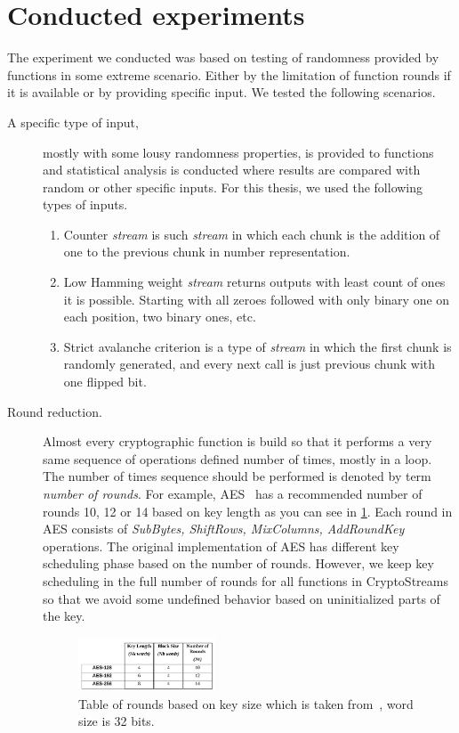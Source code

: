 \documentclass[
    digital,    %
    oneside,    %
    color,
    11pt,
    nocover,
    notable,
    nolof,
    nolot,
    final
]{fithesis3}
\renewcommand\_{\textunderscore\allowbreak}
\begin{document}
\section{Conducted experiments}
\label{sec:conducted-experiments}

The experiment we conducted was based on testing of randomness provided by functions in some extreme scenario. Either by the limitation of function rounds if it is available or by providing specific input. We tested the following scenarios.

\begin{description}
	\item[A specific type of input,] mostly with some lousy randomness properties, is provided to functions and statistical analysis is conducted where results are compared with random or other specific inputs. For this thesis, we used the following types of inputs.
	\begin{enumerate}
		\item Counter \textit{stream} is such \textit{stream} in which each chunk is the addition of one to the previous chunk in number representation.
		\item Low Hamming weight \textit{stream} returns outputs with least count of ones it is possible. Starting with all zeroes followed with only binary one on each position, two binary ones, etc.
		\item Strict avalanche criterion is a type of \textit{stream} in which the first chunk is randomly generated, and every next call is just previous chunk with one flipped bit.
	\end{enumerate}

	\item[Round reduction.] Almost every cryptographic function is build so that it performs a very same sequence of operations defined number of times, mostly in a loop. The number of times sequence should be performed is denoted by term \textit{number of rounds}. For example, AES~\cite{FIPS-197} has a recommended number of rounds 10, 12 or 14 based on key length as you can see in \cref{fig:fips197-rounds}. Each round in AES consists of \textit{SubBytes, ShiftRows, MixColumns, AddRoundKey} operations. The original implementation of AES has different key scheduling phase based on the number of rounds. However, we keep key scheduling in the full number of rounds for all functions in CryptoStreams so that we avoid some undefined behavior based on uninitialized parts of the key.
	
	\begin{figure}[h]
		\centering
		\includegraphics[width=0.4\textwidth]{./images/pictures/FIPS197-Nr-table.png}
		\caption{Table of rounds based on key size which is taken from~\cite{FIPS-197}, word size is 32 bits.}
		\label{fig:fips197-rounds}
	\end{figure}


\end{description}
\end{document}
